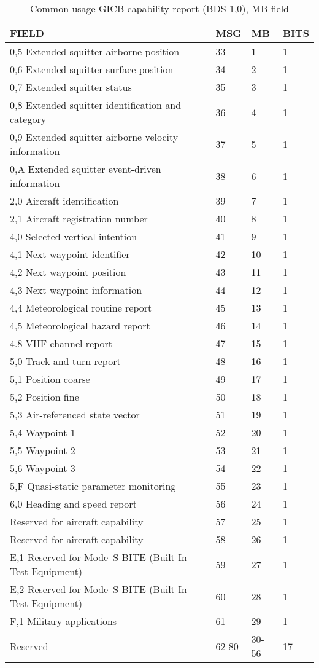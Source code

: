 \begin{table}[ht]
\footnotesize
\centering
\caption{Common usage GICB capability report (BDS 1,0), MB field}
\label{tb:bds17}
\begin{tabular}{|l|l|l|l|}
\hline
\textbf{FIELD} & \textbf{MSG} & \textbf{MB} & \textbf{BITS} \\ \hline
0,5 Extended squitter airborne position & 33 & 1 & 1 \\ \hline
0,6 Extended squitter surface position & 34 & 2 & 1 \\ \hline
0,7 Extended squitter status & 35 & 3 & 1 \\ \hline
0,8 Extended squitter identification and category & 36 & 4 & 1 \\ \hline
0,9 Extended squitter airborne velocity information & 37 & 5 & 1 \\ \hline
0,A Extended squitter event-driven information & 38 & 6 & 1 \\ \hline
2,0 Aircraft identification & 39 & 7 & 1 \\ \hline
2,1 Aircraft registration number & 40 & 8 & 1 \\ \hline
4,0 Selected vertical intention & 41 & 9 & 1 \\ \hline
4,1 Next waypoint identifier & 42 & 10 & 1 \\ \hline
4,2 Next waypoint position & 43 & 11 & 1 \\ \hline
4,3 Next waypoint information & 44 & 12 & 1 \\ \hline
4,4 Meteorological routine report & 45 & 13 & 1 \\ \hline
4,5 Meteorological hazard report & 46 & 14 & 1 \\ \hline
4.8 VHF channel report & 47 & 15 & 1 \\ \hline
5,0 Track and turn report & 48 & 16 & 1 \\ \hline
5,1 Position coarse & 49 & 17 & 1 \\ \hline
5,2 Position fine & 50 & 18 & 1 \\ \hline
5,3 Air-referenced state vector & 51 & 19 & 1 \\ \hline
5,4 Waypoint 1 & 52 & 20 & 1 \\ \hline
5,5 Waypoint 2 & 53 & 21 & 1 \\ \hline
5,6 Waypoint 3 & 54 & 22 & 1 \\ \hline
5,F Quasi-static parameter monitoring & 55 & 23 & 1 \\ \hline
6,0 Heading and speed report & 56 & 24 & 1 \\ \hline
Reserved for aircraft capability & 57 & 25 & 1 \\ \hline
Reserved for aircraft capability & 58 & 26 & 1 \\ \hline
E,1 Reserved for Mode~S BITE (Built In Test Equipment) & 59 & 27 & 1 \\ \hline
E,2 Reserved for Mode~S BITE (Built In Test Equipment) & 60 & 28 & 1 \\ \hline
F,1 Military applications & 61 & 29 & 1 \\ \hline
Reserved & 62-80 & 30-56 & 17 \\ \hline
\end{tabular}
\end{table}

